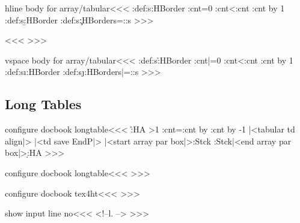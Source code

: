 \<hline body for array/tabular\><<<
\append:def\hline:s{\a:HBorder}%
\def\:tempb{\ifnum \tmp:cnt<\ar:cnt 
    \advance\tmp:cnt by 1 \append:def\hline:s{\b:HBorder}%
    \expandafter\:tempb
  \fi }%
\tmp:cnt=0 
\append:def\hline:s{\c:HBorder}\global\let\hline:s=\hline:s
>>>



\<\><<<
>>>

\<vspace body for array/tabular\><<<
\append:def\vspc:s{\h:HBorder}%
\def\:tempb{\ifnum \tmp:cnt<\ar:cnt 
    \advance\tmp:cnt by 1 \append:def\vspc:s{\i:HBorder}%
    \expandafter\:tempb
  \fi }
\tmp:cnt|=0 
\append:def\vspc:s{\j:HBorder}\global\let\vspc:s|=\vspc:s
>>>




\subsection{Long Tables}

\<configure docbook longtable\><<<
   {\IgnorePar\EndP 
    }
   {\ShowPar}
   {\halignTR\HCode{>}}
   {\r:HA}
   {%
    \halignTD
    \ifnum \HMultispan>1 
       \tmp:cnt=\HCol \advance\tmp:cnt by \HMultispan
       \advance\tmp:cnt by -1
       \fi
    |<tabular td align|>%
    |<td save EndP|>%
    |<start array par box|>\PushStack\Table:Stck\TableNo}
   {\PopStack\Table:Stck\TableNo |<end array par box|>\d:HA}
>>>



\<configure docbook longtable\><<<
\def\r:HA{\HCode{</row>}}
\def\d:HA{\ifvmode \IgnorePar \fi \EndP\HCode{</entry>}|<td recall EndP|>}
>>>


\<configure docbook tex4ht\><<<
\newif\ifHCond
>>>


\<show input line no\><<<
<!--l. \the{}-->%
>>>


